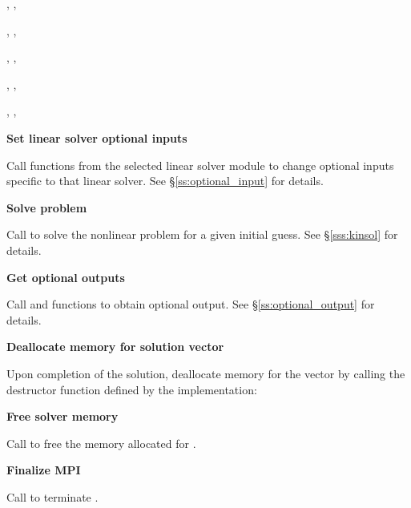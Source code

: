 \begin{Steps}
  {\s, \omp, \pt} 

  {\s, \omp, \pt} 

  {\s, \omp, \pt} 

  {\s, \omp, \pt} 

  {\s, \omp, \pt} 

  
  
  
  
\item
  {\bf Set linear solver optional inputs}

  Call  functions from the selected linear solver module to
  change optional inputs specific to that linear solver.
  See \S\ref{ss:optional_input} for details.

\item
  {\bf Solve problem}

  Call  to solve the nonlinear problem for a given
  initial guess. See \S\ref{sss:kinsol} for details.

\item
  {\bf Get optional outputs}

  Call  and  functions to obtain optional output.
  See \S\ref{ss:optional_output} for details.

\item
  {\bf Deallocate memory for solution vector}

  Upon completion of the solution, deallocate memory for the vector 
  by calling the destructor function defined by the {\nvector} implementation:

  {\s} 

  {\omp} 

  {\pt} 

  {\p} 
  
\item
  {\bf Free solver memory}

  Call  to free the memory allocated for {\kinsol}.
  
\item 
  {\bf {\p} Finalize MPI}

  Call  to terminate {\mpi}.
  
\end{Steps}

